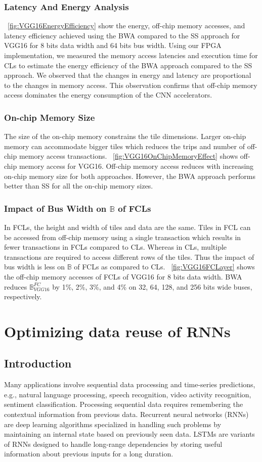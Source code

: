 \documentclass[a4paper,10pt]{article}
\newcommand{\numBytesOffChip}{\mathbb{B}}
\begin{document}
\subsubsection{Latency And Energy Analysis}
\figurename{~\ref{fig:VGG16EnergyEfficiency}} show the energy, off-chip memory accesses, and latency efficiency achieved using the BWA compared to the SS approach for VGG16 for 8 bits data width and 64 bits bus width. Using our FPGA implementation, we measured the memory access latencies and execution time for CLs to estimate the energy efficiency of the BWA approach compared to the SS approach. We observed that the changes in energy and latency are proportional to the changes in memory access. This observation confirms that off-chip memory access dominates the energy consumption of the CNN accelerators.
\subsubsection{On-chip Memory Size}
The size of the on-chip memory constrains the tile dimensions. Larger on-chip memory can accommodate bigger tiles which reduces the trips and number of off-chip memory access transactions. \figurename{~\ref{fig:VGG16OnChipMemoryEffect}} shows off-chip memory access for VGG16. Off-chip memory access reduces with increasing on-chip memory size for both approaches. However, the BWA approach performs better than SS for all the on-chip memory sizes.
\subsubsection{Impact of Bus Width on $\numBytesOffChip$ of FCLs}
In FCLs, the height and width of tiles and data are the same. Tiles in FCL can be accessed from off-chip memory using a single transaction which results in fewer transactions in FCLs compared to CLs. Whereas in CLs, multiple transactions are required to access different rows of the tiles. Thus the impact of bus width is less on $\numBytesOffChip$ of FCLs as compared to CLs. \figurename~\ref{fig:VGG16FCLayer} shows the off-chip memory accesses of FCLs of VGG16 for 8 bits data width. BWA reduces $\numBytesOffChip_{VGG16}^{FC}$ by 1\%, 2\%, 3\%, and 4\% on 32, 64, 128, and 256 bits wide buses, respectively. 
\section{Optimizing data reuse of RNNs}
\subsection{Introduction}
Many applications involve sequential data processing and time-series predictions, e.g., natural language processing, speech recognition, video activity recognition, sentiment classification. Processing sequential data requires remembering the contextual information from previous data. Recurrent neural networks (RNNs) are deep learning algorithms specialized in handling such problems by maintaining an internal state based on previously seen data. LSTMs \cite{hochreiter1997long} are variants of RNNs designed to handle long-range dependencies by storing useful information about previous inputs for a long duration. 
\end{document}
